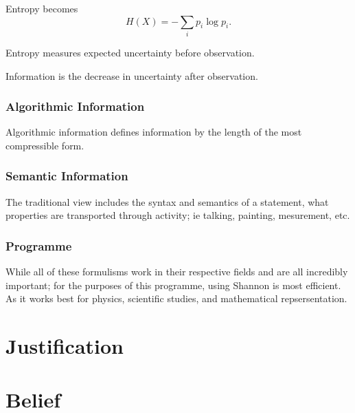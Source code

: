Entropy becomes
\[
H(X)=-\sum_i p_i\log p_i.
\]

Entropy measures expected uncertainty before observation.

Information is the decrease in uncertainty after observation.

\subsubsection{Algorithmic Information}

Algorithmic information defines information by the length of the most compressible form.

\subsubsection{Semantic Information}

The traditional view includes the syntax and semantics of a statement, what properties are transported through activity; ie talking, painting, mesurement, etc.

\subsubsection{Programme}

While all of these formulisms work in their respective fields and are all incredibly important; for the purposes of this programme, using Shannon is most efficient. As it works best for physics, scientific studies, and mathematical repsersentation.
\section{Justification}


\section{Belief}
